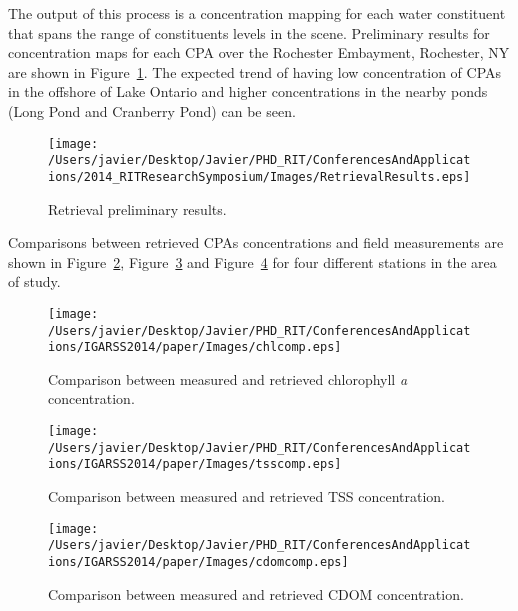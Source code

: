 \documentclass{article}
\begin{document}
The output of this process is a concentration mapping for each water constituent that spans the range of constituents levels in the scene. Preliminary results for concentration maps for each CPA over the Rochester Embayment, Rochester, NY are shown in Figure~\ref{fig:retrievalresults}. The expected trend of having low concentration of CPAs in the offshore of Lake Ontario and higher concentrations in the nearby ponds (Long Pond and Cranberry Pond) can be seen. 
\begin{figure}[htb]
\centering
\texttt{[image: /Users/javier/Desktop/Javier/PHD\_RIT/ConferencesAndApplications/2014\_RITResearchSymposium/Images/RetrievalResults.eps]}
   \caption{Retrieval preliminary results.}
      \label{fig:retrievalresults}   
\end{figure}

Comparisons between retrieved CPAs concentrations and field measurements are shown in Figure~\ref{fig:chlcomp}, Figure~\ref{fig:tsscomp} and Figure~\ref{fig:cdomcomp} for four different stations in the area of study.
\begin{figure}[htb]
\centering
    \texttt{[image: /Users/javier/Desktop/Javier/PHD\_RIT/ConferencesAndApplications/IGARSS2014/paper/Images/chlcomp.eps]} 
    \caption{Comparison between measured and retrieved chlorophyll {\it a} concentration.}
    \label{fig:chlcomp} 
\end{figure}     

\begin{figure}[htb]
\centering
    \texttt{[image: /Users/javier/Desktop/Javier/PHD\_RIT/ConferencesAndApplications/IGARSS2014/paper/Images/tsscomp.eps]}   
    \caption{Comparison between measured and retrieved TSS concentration.}
    \label{fig:tsscomp} 
\end{figure}  

\begin{figure}[htb]
\centering
    \texttt{[image: /Users/javier/Desktop/Javier/PHD\_RIT/ConferencesAndApplications/IGARSS2014/paper/Images/cdomcomp.eps]}    
    \caption{Comparison between measured and retrieved CDOM concentration.}
    \label{fig:cdomcomp} 
\end{figure}  
\end{document}
